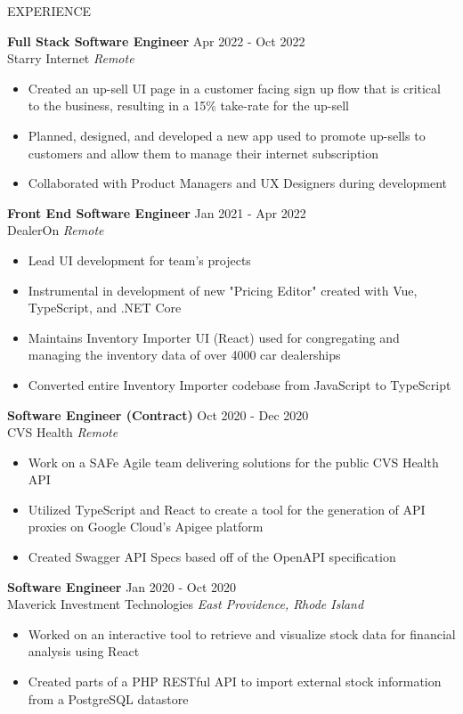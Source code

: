 \documentclass{resume} %
\begin{document}
\begin{rSection}{EXPERIENCE}

\textbf{Full Stack Software Engineer} \hfill  Apr 2022 - Oct 2022\\
Starry Internet \hfill  \textit{Remote}
 \begin{itemize}
    \itemsep -3pt {}
    \item Created an up-sell UI page in a customer facing sign up flow that is critical to the business, resulting in a 15\% take-rate for the up-sell
     \item Planned, designed, and developed a new app used to promote up-sells to customers and allow them to manage their internet subscription
     \item Collaborated with Product Managers and UX Designers during development
 \end{itemize}

\textbf{Front End Software Engineer} \hfill  Jan 2021 - Apr 2022\\
DealerOn \hfill  \textit{Remote}
 \begin{itemize}
    \itemsep -3pt {}
    \item Lead UI development for team's projects
     \item Instrumental in development of new "Pricing Editor" created with Vue, TypeScript, and .NET Core
     \item Maintains Inventory Importer UI (React) used for congregating and managing the inventory data of over 4000 car dealerships
     \item Converted entire Inventory Importer codebase from JavaScript to TypeScript
 \end{itemize}

 \textbf{Software Engineer (Contract)} \hfill  Oct 2020 - Dec 2020\\
CVS Health \hfill \textit{Remote}
 \begin{itemize}
    \itemsep -3pt {} 
     \item Work on a SAFe Agile team delivering solutions for the public CVS Health API 
     \item Utilized TypeScript and React to create a tool for the generation of API proxies on Google Cloud's Apigee platform
     \item Created Swagger API Specs based off of the OpenAPI specification

    
 \end{itemize}

\textbf{Software Engineer} \hfill Jan 2020 - Oct 2020\\
Maverick Investment Technologies \hfill \textit{East Providence, Rhode Island}
 \begin{itemize}
    \itemsep -3pt {} 
    \item Worked on an interactive tool to retrieve and visualize stock data for financial analysis using React
    \item Created parts of a PHP RESTful API to import external stock information from a PostgreSQL datastore 
 \end{itemize}
 
\end{rSection} 
\end{document}
